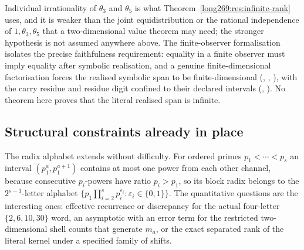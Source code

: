 \documentclass[11pt]{article}
\begin{document}
Individual irrationality of $\theta_3$ and $\theta_5$ is what
Theorem~\ref{long269:res:infinite-rank} uses, and it is weaker than the joint
equidistribution or the rational independence of $1,\theta_3,\theta_5$ that a
two-dimensional value theorem may need; the stronger hypothesis is not assumed
anywhere above.  The finite-observer formalisation isolates the precise
faithfulness requirement: equality in a finite observer must imply equality
after symbolic realisation, and a genuine finite-dimensional factorisation
forces the realised symbolic span to be finite-dimensional
(,
,
),
with the carry residue and residue digit confined to their declared intervals
(,
).  No theorem here proves that the literal realised span is infinite.

\subsection{Structural constraints already in place}

The radix alphabet extends without difficulty.  For ordered primes
$p_1<\cdots<p_s$ an interval $(p_1^{a},p_1^{a+1})$ contains at most one power
from each other channel, because consecutive $p_i$-powers have ratio
$p_i>p_1$, so its block radix belongs to the $2^{s-1}$-letter alphabet
$\{p_1\prod_{i=2}^{s}p_i^{\varepsilon_i}:\varepsilon_i\in\{0,1\}\}$.  The
quantitative questions are the interesting ones: effective recurrence or
discrepancy for the actual four-letter $\{2,6,10,30\}$ word, an asymptotic with
an error term for the restricted two-dimensional shell counts that generate
$m_a$, or the exact separated rank of the literal kernel under a specified
family of shifts.
\end{document}
